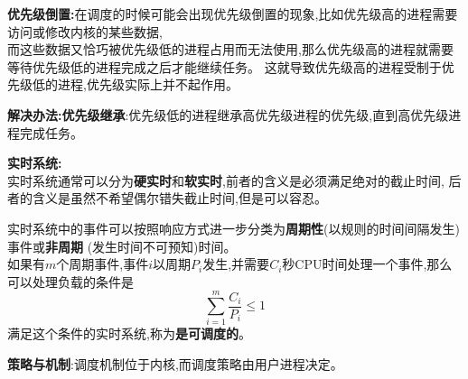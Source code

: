 \documentclass[UTF8,a4paper]{ctexart}
\newcommand{\spaceline}{\vspace{\baselineskip}}
\begin{document}
    \spaceline
    \textbf{优先级倒置:}在调度的时候可能会出现优先级倒置的现象,比如优先级高的进程需要访问或修改内核的某些数据,\\
    而这些数据又恰巧被优先级低的进程占用而无法使用,那么优先级高的进程就需要等待优先级低的进程完成之后才能继续任务。
    这就导致优先级高的进程受制于优先级低的进程,优先级实际上并不起作用。

    \textbf{解决办法:优先级继承}:优先级低的进程继承高优先级进程的优先级,直到高优先级进程完成任务。

    \spaceline
    \textbf{实时系统:}\\
    实时系统通常可以分为\textbf{硬实时}和\textbf{软实时},前者的含义是必须满足绝对的截止时间,
    后者的含义是虽然不希望偶尔错失截止时间,但是可以容忍。

    \spaceline
    实时系统中的事件可以按照响应方式进一步分类为\textbf{周期性}(以规则的时间间隔发生)事件或\textbf{非周期}
    (发生时间不可预知)时间。\\
    如果有$m$个周期事件,事件$i$以周期$P_i$发生,并需要$C_i$秒CPU时间处理一个事件,那么可以处理负载的条件是
    \[\sum_{i = 1}^m \frac{C_i}{P_i} \leq 1\]
    满足这个条件的实时系统,称为\textbf{是可调度的}。

    \spaceline
    \textbf{策略与机制}:调度机制位于内核,而调度策略由用户进程决定。
\end{document}
